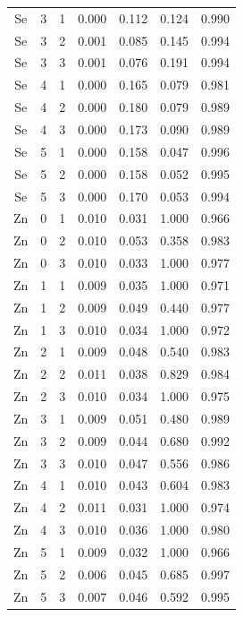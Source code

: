 \documentclass[ms, hidelinks]{uncgdissertationexp3}
\theoremstyle{plain}
\theoremstyle{definition}
\theoremstyle{remark}
\begin{document}
\begin{longtable}{ccccccc}
  Se & 3 & 1 & 0.000 & 0.112 & 0.124 & 0.990\\
  \rowcolor{gray!6}  Se & 3 & 2 & 0.001 & 0.085 & 0.145 & 0.994\\
  Se & 3 & 3 & 0.001 & 0.076 & 0.191 & 0.994\\
  \rowcolor{gray!6}  Se & 4 & 1 & 0.000 & 0.165 & 0.079 & 0.981\\
  Se & 4 & 2 & 0.000 & 0.180 & 0.079 & 0.989\\
  \rowcolor{gray!6}  Se & 4 & 3 & 0.000 & 0.173 & 0.090 & 0.989\\
  Se & 5 & 1 & 0.000 & 0.158 & 0.047 & 0.996\\
  \rowcolor{gray!6}  Se & 5 & 2 & 0.000 & 0.158 & 0.052 & 0.995\\
  Se & 5 & 3 & 0.000 & 0.170 & 0.053 & 0.994\\
  \rowcolor{gray!6}  Zn & 0 & 1 & 0.010 & 0.031 & 1.000 & 0.966\\
  Zn & 0 & 2 & 0.010 & 0.053 & 0.358 & 0.983\\
  \rowcolor{gray!6}  Zn & 0 & 3 & 0.010 & 0.033 & 1.000 & 0.977\\
  Zn & 1 & 1 & 0.009 & 0.035 & 1.000 & 0.971\\
  \rowcolor{gray!6}  Zn & 1 & 2 & 0.009 & 0.049 & 0.440 & 0.977\\
  Zn & 1 & 3 & 0.010 & 0.034 & 1.000 & 0.972\\
  \rowcolor{gray!6}  Zn & 2 & 1 & 0.009 & 0.048 & 0.540 & 0.983\\
  Zn & 2 & 2 & 0.011 & 0.038 & 0.829 & 0.984\\
  \rowcolor{gray!6}  Zn & 2 & 3 & 0.010 & 0.034 & 1.000 & 0.975\\
  Zn & 3 & 1 & 0.009 & 0.051 & 0.480 & 0.989\\
  \rowcolor{gray!6}  Zn & 3 & 2 & 0.009 & 0.044 & 0.680 & 0.992\\
  Zn & 3 & 3 & 0.010 & 0.047 & 0.556 & 0.986\\
  \rowcolor{gray!6}  Zn & 4 & 1 & 0.010 & 0.043 & 0.604 & 0.983\\
  Zn & 4 & 2 & 0.011 & 0.031 & 1.000 & 0.974\\
  \rowcolor{gray!6}  Zn & 4 & 3 & 0.010 & 0.036 & 1.000 & 0.980\\
  Zn & 5 & 1 & 0.009 & 0.032 & 1.000 & 0.966\\
  \rowcolor{gray!6}  Zn & 5 & 2 & 0.006 & 0.045 & 0.685 & 0.997\\
  Zn & 5 & 3 & 0.007 & 0.046 & 0.592 & 0.995\\*
  \end{longtable}
\end{document}
